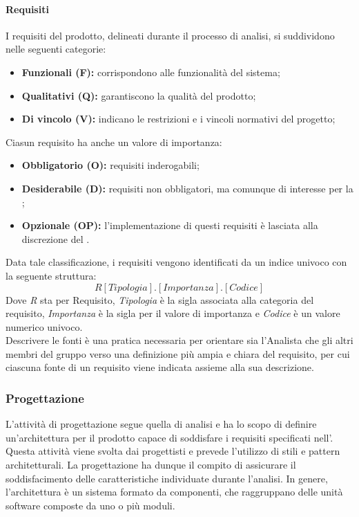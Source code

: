 \paragraph{Requisiti}
I requisiti del prodotto, delineati durante il processo di analisi, si suddividono nelle seguenti categorie:
\begin{itemize}
  \item \textbf{Funzionali (F):} corrispondono alle funzionalità del sistema;
  \item \textbf{Qualitativi (Q):} garantiscono la qualità del prodotto;
  \item \textbf{Di vincolo (V):} indicano le restrizioni e i vincoli normativi del progetto;
\end{itemize}
Ciasun requisito ha anche un valore di importanza:
\begin{itemize}
  \item \textbf{Obbligatorio (O):} requisiti inderogabili;
  \item \textbf{Desiderabile (D):} requisiti non obbligatori, ma comunque di interesse per la ;
  \item \textbf{Opzionale (OP):} l'implementazione di questi requisiti è lasciata alla discrezione del .
\end{itemize}
Data tale classificazione, i requisiti vengono identificati da un indice univoco con la seguente struttura:
\[R[Tipologia].[Importanza].[Codice]\]
Dove \emph{R} sta per Requisito, \emph{Tipologia} è la sigla associata alla categoria del requisito, \emph{Importanza} è la sigla per il valore di importanza e \emph{Codice} è un valore numerico univoco.\\
Descrivere le fonti è una pratica necessaria per orientare sia l'Analista che gli altri membri del gruppo verso una definizione più ampia e chiara del requisito, per cui ciascuna fonte di un requisito viene indicata assieme alla sua descrizione.

\subsubsection{Progettazione}\label{progettazione}
\par L'attività di progettazione segue quella di analisi e ha lo scopo di definire un'architettura per il prodotto capace di soddisfare i requisiti specificati nell’\AnalisiDeiRequisiti. Questa attività viene svolta dai progettisti e prevede l'utilizzo di stili e pattern architetturali. La progettazione ha dunque il compito di assicurare il soddisfacimento delle caratteristiche individuate durante l'analisi. In genere, l'architettura è un sistema formato da componenti, che raggruppano delle unità software composte da uno o più moduli.

